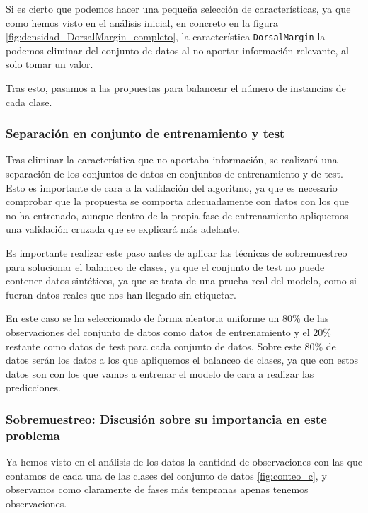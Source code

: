 Si es cierto que podemos hacer una pequeña selección de características, ya que como hemos visto en el análisis inicial, en concreto en la figura \ref{fig:densidad_DorsalMargin_completo}, la característica \texttt{DorsalMargin} la podemos eliminar del conjunto de datos al no aportar información relevante, al solo tomar un valor.

Tras esto, pasamos a las propuestas para balancear el número de instancias de cada clase.

\subsubsection{Separación en conjunto de entrenamiento y test}

Tras eliminar la característica que no aportaba información, se realizará una separación de los conjuntos de datos en conjuntos de entrenamiento y de test. Esto es importante de cara a la validación del algoritmo, ya que es necesario comprobar que la propuesta se comporta adecuadamente con datos con los que no ha entrenado, aunque dentro de la propia fase de entrenamiento apliquemos una validación cruzada que se explicará más adelante.

Es importante realizar este paso antes de aplicar las técnicas de sobremuestreo para solucionar el balanceo de clases, ya que el conjunto de test no puede contener datos sintéticos, ya que se trata de una prueba real del modelo, como si fueran datos reales que nos han llegado sin etiquetar.

En este caso se ha seleccionado de forma aleatoria uniforme un 80\% de las observaciones del conjunto de datos como datos de entrenamiento y el 20\% restante como datos de test para cada conjunto de datos. Sobre este 80\% de datos serán los datos a los que apliquemos el balanceo de clases, ya que con estos datos son con los que vamos a entrenar el modelo de cara a realizar las predicciones.

\newpage

\subsubsection{Sobremuestreo: Discusión sobre su importancia en este problema}

Ya hemos visto en el análisis de los datos la cantidad de observaciones con las que contamos de cada una de las clases del conjunto de datos \ref{fig:conteo_c}, y observamos como claramente de fases más tempranas apenas tenemos observaciones.


